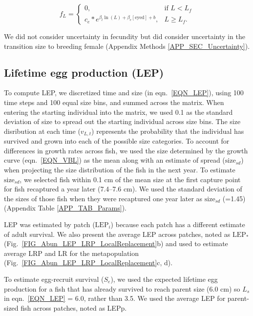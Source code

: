 \documentclass[12pt, oneside]{article}   	%
\begin{document}
\begin{equation}
f_L = 
\begin{cases}
0, & \text{if } L < L_f \\
c_e * e^{\beta_l\ln(L) + \beta_e[\text{eyed}] + b}, & L \geq L_f. \label{EQN_Fec}
\end{cases}
\end{equation}

We did not consider uncertainty in fecundity but did consider uncertainty in the transition size to breeding female (Appendix Methods \ref{APP_SEC_Uncertainty}).

\subsection{Lifetime egg production (LEP)} \label{APP_SEC_METHODS_LEP}

To compute LEP, we discretized time and size (in eqn.\ \ref{EQN_LEP}), using 100 time steps and 100 equal size bins, and summed across the matrix. When entering the starting individual into the matrix, we used 0.1 as the standard deviation of size to spread out the starting individual across size bins. The size disribution at each time ($v_{L,t}$) represents the probability that the individual has survived and grown into each of the possible size categories. To account for differences in growth rates across fish, we used the size determined by the growth curve (eqn.\ \ref{EQN_VBL}) as the mean along with an estimate of spread ($\text{size}_{sd}$) when projecting the size distribution of the fish in the next year. To estimate $\text{size}_{sd}$, we selected fish within 0.1 cm of the mean size at the first capture point for fish recaptured a year later (7.4--7.6 cm). We used the standard deviation of the sizes of those fish when they were recaptured one year later as $\text{size}_{sd}$ (=1.45) (Appendix Table \ref{APP_TAB_Params}). 

LEP was estimated by patch ($\text{LEP}_i$) because each patch has a different estimate of adult survival. We also present the average LEP across patches, noted as $\text{LEP}_*$ (Fig.\ \ref{FIG_Abun_LEP_LRP_LocalReplacement}b) and used to estimate average LRP and LR for the metapopulation (Fig.\ \ref{FIG_Abun_LEP_LRP_LocalReplacement}c, d). 

To estimate egg-recruit survival ($S_e$), we used the expected lifetime egg production for a fish that has already survived to reach parent size (6.0 cm) so $L_s$ in eqn.\ \ref{EQN_LEP} = 6.0, rather than 3.5. We used the average LEP for parent-sized fish across patches, noted as LEPp.
\end{document}
